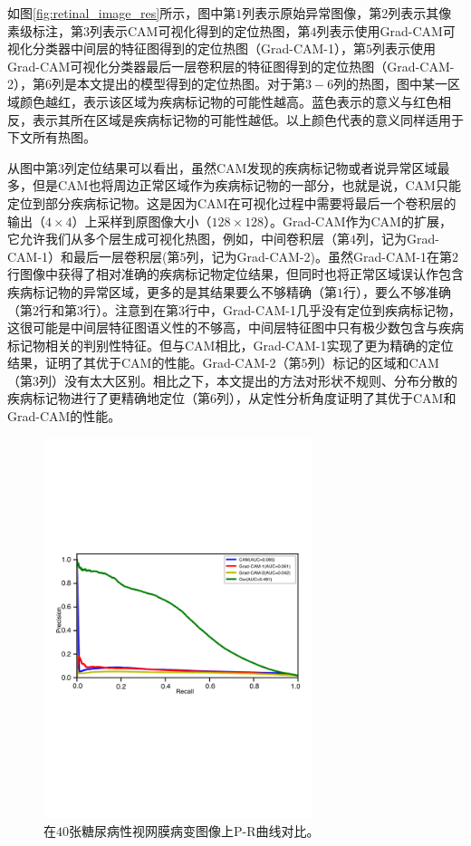如图\ref{fig:retinal_image_res}所示，图中第$1$列表示原始异常图像，第$2$列表示其像素级标注，第$3$列表示CAM可视化得到的定位热图，第$4$列表示使用Grad-CAM可视化分类器中间层的特征图得到的定位热图（Grad-CAM-1），第$5$列表示使用Grad-CAM可视化分类器最后一层卷积层的特征图得到的定位热图（Grad-CAM-2），第$6$列是本文提出的模型得到的定位热图。对于第$3-6$列的热图，图中某一区域颜色越红，表示该区域为疾病标记物的可能性越高。蓝色表示的意义与红色相反，表示其所在区域是疾病标记物的可能性越低。以上颜色代表的意义同样适用于下文所有热图。

从图中第$3$列定位结果可以看出，虽然CAM发现的疾病标记物或者说异常区域最多，但是CAM也将周边正常区域作为疾病标记物的一部分，也就是说，CAM只能定位到部分疾病标记物。这是因为CAM在可视化过程中需要将最后一个卷积层的输出（$4\times 4$）上采样到原图像大小（$128\times 128$）。Grad-CAM作为CAM的扩展，它允许我们从多个层生成可视化热图，例如，中间卷积层（第$4$列，记为Grad-CAM-1）和最后一层卷积层(第$5$列，记为Grad-CAM-2)。虽然Grad-CAM-1在第$2$行图像中获得了相对准确的疾病标记物定位结果，但同时也将正常区域误认作包含疾病标记物的异常区域，更多的是其结果要么不够精确（第$1$行），要么不够准确（第$2$行和第$3$行）。注意到在第$3$行中，Grad-CAM-1几乎没有定位到疾病标记物，这很可能是中间层特征图语义性的不够高，中间层特征图中只有极少数包含与疾病标记物相关的判别性特征。但与CAM相比，Grad-CAM-1实现了更为精确的定位结果，证明了其优于CAM的性能。Grad-CAM-2（第$5$列）标记的区域和CAM（第$3$列）没有太大区别。相比之下，本文提出的方法对形状不规则、分布分散的疾病标记物进行了更精确地定位（第$6$列），从定性分析角度证明了其优于CAM和Grad-CAM的性能。
\begin{figure}[h!]
	\centering
	\includegraphics[width=0.7\textwidth]{figure/pr_curve_retinal_image/pr_curve}
	\caption[在$40$张糖尿病性视网膜病变图像上P-R曲线对比]{在$40$张糖尿病性视网膜病变图像上P-R曲线对比。}
	\label{fig:retinal_image_pr_curve}
\end{figure}

